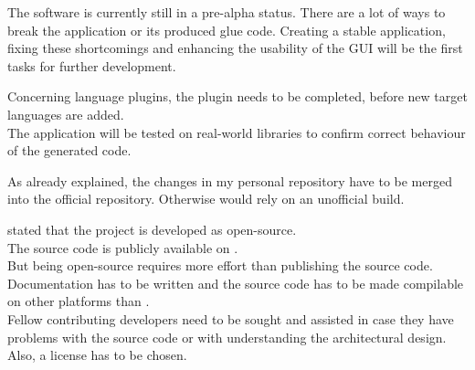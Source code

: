 The software is currently still in a pre-alpha status. There are a lot of ways to break the application or its produced glue code. Creating a stable application, fixing these shortcomings and enhancing the usability of the GUI will be the first tasks for further development.

Concerning language plugins, the  plugin needs to be completed, before new target languages are added.\\
The application will be tested on real-world libraries to confirm correct behaviour of the generated code.

As already explained, the changes in my personal  repository have to be merged into the official repository. Otherwise  would rely on an unofficial  build.

 stated that the project is developed as open-source.\\
The source code is publicly available on .\\ But being open-source requires more effort than publishing the source code. Documentation has to be written and the source code has to be made compilable on other platforms than .\\
Fellow contributing developers need to be sought and assisted in case they have problems with the source code or with understanding the architectural design.\\
Also, a license has to be chosen.